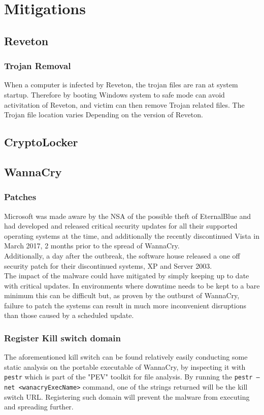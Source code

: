 \documentclass[10pt]{article}
\begin{document}
\section{Mitigations}
\subsection{Reveton}
\subsubsection{Trojan Removal}
When a computer is infected by Reveton, the trojan files are ran at system startup. Therefore by booting Windows system to safe mode can avoid activitation of Reveton, and victim can then remove Trojan related files. The Trojan file location varies Depending on the version of Reveton.
\subsection{CryptoLocker}
\subsection{WannaCry}
\subsubsection{Patches}
Microsoft was made aware by the NSA of the possible theft of EternalBlue and had developed and released critical security updates for all their supported operating systems at the time, and additionally the recently discontinued Vista in March 2017, 2 months prior to the spread of WannaCry. \\
Additionally, a day after the outbreak, the software house released a one off security patch for their discontinued systems, XP and Server 2003.\\
The impact of the malware could have mitigated by simply keeping up to date with critical updates. In environments where downtime needs to be kept to a bare minimum this can be difficult but, as proven by the outburst of WannaCry, failure to patch the systems can result in much more inconvenient disruptions than those caused by a scheduled update.
\subsubsection{Register Kill switch domain}
The aforementioned kill switch can be found relatively easily conducting some static analysis on the portable executable of WannaCry, by inspecting it with \texttt{pestr} which is part of the "PEV" toolkit for file analysis. By running the \texttt{pestr --net <wanacryExecName>} command, one of the strings returned will be the kill switch URL. Registering such domain will prevent the malware from executing and spreading further.
\end{document}

